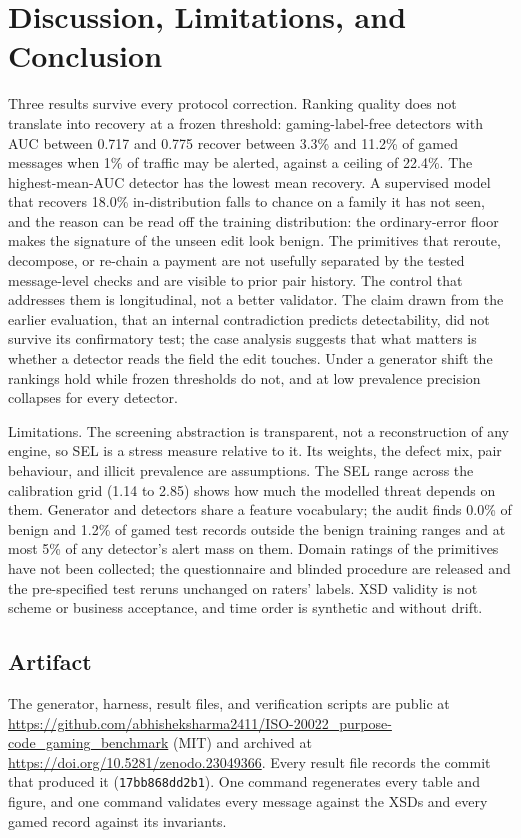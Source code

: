 \documentclass[conference]{IEEEtran}
\newif\ifanonymous
\begin{document}
\section{Discussion, Limitations, and Conclusion}
Three results survive every protocol correction. Ranking quality does not
translate into recovery at a frozen threshold: gaming-label-free detectors with AUC
between 0.717 and 0.775 recover between 3.3\% and
11.2\% of gamed messages when 1\% of traffic may be alerted,
against a ceiling of 22.4\%. The highest-mean-AUC detector has the lowest mean recovery. A supervised model that recovers 18.0\% in-distribution
falls to chance on a family it has not seen, and the reason can be read off
the training distribution: the ordinary-error floor makes the signature of
the unseen edit look benign. The primitives that reroute, decompose, or
re-chain a payment are not usefully separated by the tested message-level
checks and are visible to prior pair history. The control that addresses them is longitudinal, not a better
validator. The claim drawn from the earlier
evaluation, that an internal contradiction predicts detectability, did not
survive its confirmatory test; the case analysis suggests that what matters
is whether a detector reads the field the edit touches. Under a generator shift the
rankings hold while frozen thresholds do not, and at low prevalence
precision collapses for every detector.

Limitations. The screening abstraction is transparent, not a reconstruction
of any engine, so SEL is a stress measure relative to it. Its weights, the
defect mix, pair behaviour, and illicit prevalence are assumptions. The SEL
range across the calibration grid (1.14 to 2.85)
shows how much the modelled threat depends on them. Generator and detectors
share a feature vocabulary; the audit finds 0.0\% of benign and
1.2\% of gamed test records outside the benign training ranges
and at most 5\% of any detector's alert mass on them.
Domain ratings of the primitives have not been collected; the questionnaire
and blinded procedure are released and the pre-specified test reruns
unchanged on raters' labels. XSD validity is not scheme or business
acceptance, and time order is synthetic and without drift.

\subsection*{Artifact}
\ifanonymous
The generator, harness, result files, and verification scripts accompany
the submission and will be public on acceptance; every result file records
the commit that produced it (\texttt{17bb868dd2b1}).
\else
The generator, harness, result files, and verification scripts are public at
\url{https://github.com/abhisheksharma2411/ISO-20022_purpose-code_gaming_benchmark}
(MIT) and archived at \url{https://doi.org/10.5281/zenodo.23049366}. Every
result file records the commit that produced it (\texttt{17bb868dd2b1}). One
command regenerates every table and figure, and one command validates every
message against the XSDs and every gamed record against its invariants.
\fi
\end{document}
